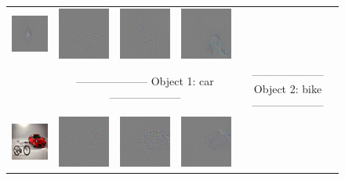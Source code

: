 \begin{figure}
\begin{center}
\begin{tabular}{ccccccc}
\includegraphics[width=0.14\linewidth,height=0.115\linewidth]{figs/examples/googlenet/soft/dog-cat4_diff_243} &
\includegraphics[width=0.14\linewidth,height=0.115\linewidth]{figs/examples/googlenet/oxford/dog-cat4_diff_286} &
\includegraphics[width=0.14\linewidth,height=0.115\linewidth]{figs/examples/googlenet/deconv/dog-cat4_diff_286} &
\includegraphics[width=0.14\linewidth,height=0.115\linewidth]{figs/examples/googlenet/soft/dog-cat4_diff_286} \\
& \multicolumn{3}{c}{\small -------------------- Object 1: car --------------------} & \multicolumn{3}{c}{\small -------------------- Object 2: bike --------------------} \\
\vspace{-2.5pt}
\includegraphics[width=0.14\linewidth,height=0.115\linewidth]{figs/examples/googlenet/oxford/bic-car1} &
\includegraphics[width=0.14\linewidth,height=0.115\linewidth]{figs/examples/googlenet/oxford/bic-car1_diff_818} &
\includegraphics[width=0.14\linewidth,height=0.115\linewidth]{figs/examples/googlenet/deconv/bic-car1_diff_818} &
\includegraphics[width=0.14\linewidth,height=0.115\linewidth]{figs/examples/googlenet/soft/bic-car1_diff_818} &

\end{tabular}
\end{center}
\end{figure}
